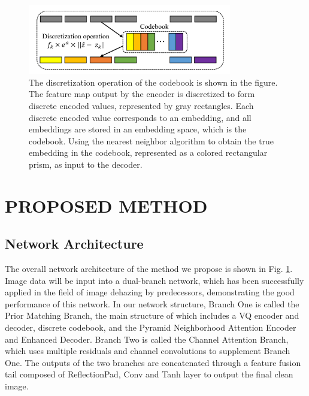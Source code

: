 \documentclass[lettersize,journal]{IEEEtran}
\begin{document}
\begin{figure}[!t]
	\centering
	\includegraphics[width=3.5in]{discretization_operation}
	\caption{The discretization operation of the codebook is shown in the figure. The feature map output by the encoder is discretized to form discrete encoded values, represented by gray rectangles. Each discrete encoded value corresponds to an embedding, and all embeddings are stored in an embedding space, which is the codebook. Using the nearest neighbor algorithm to obtain the true embedding in the codebook, represented as a colored rectangular prism, as input to the decoder.}
	\label{fig2}
\end{figure}

\section{PROPOSED METHOD}
\subsection{Network Architecture}
The overall network architecture of the method we propose is shown in Fig. \ref{fig2}. Image data will be input into a dual-branch network, which has been successfully applied in the field of image dehazing by predecessors, demonstrating the good performance of this network. In our network structure, Branch One is called the Prior Matching Branch, the main structure of which includes a VQ encoder and decoder, discrete codebook, and the Pyramid Neighborhood Attention Encoder and Enhanced Decoder. Branch Two is called the Channel Attention Branch, which uses multiple residuals and channel convolutions to supplement Branch One. The outputs of the two branches are concatenated through a feature fusion tail composed of ReflectionPad, Conv and Tanh layer to output the final clean image.
\end{document}
